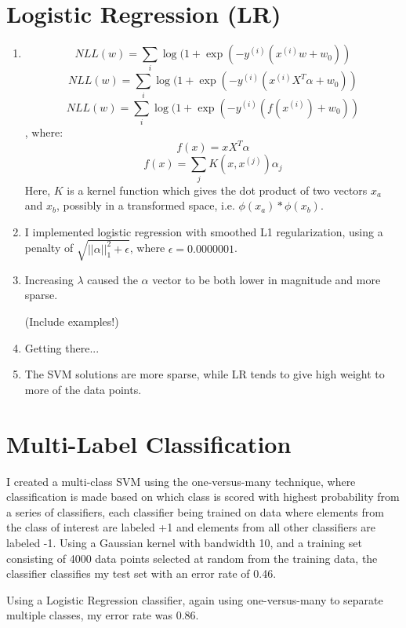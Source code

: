 \documentclass{paper}
\begin{document}
\section{Logistic Regression (LR)}

\begin{enumerate}
    \item
    \[ NLL(w) = \sum_i \log(1 + \exp(-y^{(i)} (x^{(i)} w + w_0)  ) \]
    \[ NLL(w) = \sum_i \log(1 + \exp(-y^{(i)} (x^{(i)} X^T \alpha + w_0)  ) \]
    \[ NLL(w) = \sum_i \log(1 + \exp(-y^{(i)} (f(x^{(i)}) + w_0)  ) \], where:
    \[ f(x) = x X^T \alpha \]
    \[ f(x) = \sum_j K(x, x^{(j)}) \alpha_j \]
    Here, $K$ is a kernel function which gives the dot product of two vectors $x_a$ and $x_b$, possibly in a transformed space, i.e. $\phi(x_a)*\phi(x_b)$.

    \item
        I implemented logistic regression with smoothed L1 regularization, using a penalty of $\sqrt{||\alpha||_1^2 + \epsilon}$, where $\epsilon = 0.0000001$.

    \item
        Increasing $\lambda$ caused the $\alpha$ vector to be both lower in magnitude and more sparse.

        (Include examples!)

    \item
        Getting there...

    \item
        The SVM solutions are more sparse, while LR tends to give high weight to more of the data points.

\end{enumerate}

\section{Multi-Label Classification}

I created a multi-class SVM using the one-versus-many technique, where classification is made based on which class is scored with highest probability from a series of classifiers, each classifier being trained on data where elements from the class of interest are labeled +1 and elements from all other classifiers are labeled -1. Using a Gaussian kernel with bandwidth 10, and a training set consisting of 4000 data points selected at random from the training data, the classifier classifies my test set with an error rate of 0.46. 

Using a Logistic Regression classifier, again using one-versus-many to separate multiple classes, my error rate was 0.86.
\end{document}
